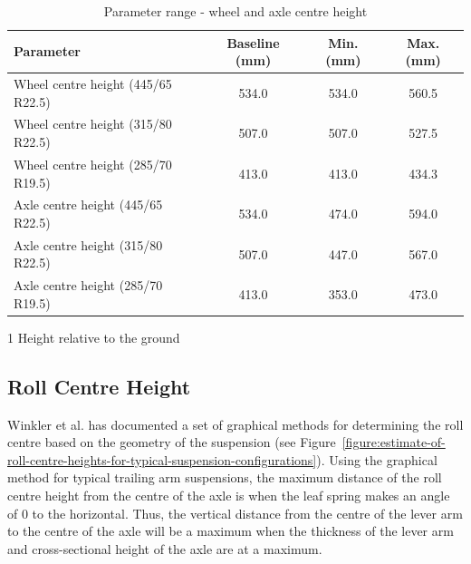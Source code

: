 \begin{table}[H]
	\centering\footnotesize
	\begin{threeparttable}

		\begin{tabulary}{\textwidth}{lccc}
			\toprule
			\textbf{Parameter} & \textbf{Baseline (mm)} & \textbf{Min. (mm) } & \textbf{Max. (mm)}\\
			\midrule
            
            Wheel centre height (445/65 R22.5) & 534.0   & 534.0   & 560.5 \\
            Wheel centre height (315/80 R22.5) & 507.0  & 507.0   & 527.5 \\
            Wheel centre height (285/70 R19.5) & 413.0   & 413.0   & 434.3 \\          
            Axle centre height (445/65 R22.5) & 534.0   & 474.0   & 594.0 \\
            Axle centre height (315/80 R22.5) & 507.0   & 447.0   & 567.0 \\
            Axle centre height (285/70 R19.5) & 413.0   & 353.0  & 473.0 \\
            
			\bottomrule
		\end{tabulary}

		\caption{Parameter range - wheel and axle centre height}
		\label{table:parameter-range-wheel-and-axle-centre-height}

		\begin{tablenotes}
			\item[1] Height relative to the ground
		\end{tablenotes}

	\end{threeparttable}
\end{table}

\subsection{Roll Centre Height}\label{section:pr-roll-centre-heights}

Winkler et al. \cite{Winkler2011} has documented a set of graphical methods for determining the roll centre based on the geometry of the suspension (see Figure~\ref{figure:estimate-of-roll-centre-heights-for-typical-suspension-configurations}). Using the graphical method for typical trailing arm suspensions, the maximum distance of the roll centre height from the centre of the axle is when the leaf spring makes an angle of 0\degree{} to the horizontal. Thus, the vertical distance from the centre of the lever arm to the centre of the axle will be a maximum when the thickness of the lever arm and cross-sectional height of the axle are at a maximum.

